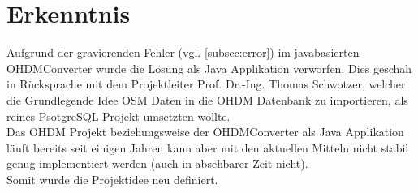 \newpage
\section{Erkenntnis}
Aufgrund der gravierenden Fehler (vgl. \autoref{subsec:error}) im javabasierten OHDMConverter wurde die Lösung als Java Applikation verworfen. Dies geschah in Rücksprache mit dem Projektleiter Prof. Dr.-Ing. Thomas Schwotzer, welcher die Grundlegende Idee \ac{OSM} Daten in die \ac{OHDM} Datenbank zu importieren, als reines PsotgreSQL Projekt umsetzten wollte.\\
Das \ac{OHDM} Projekt beziehungsweise der OHDMConverter als Java Applikation läuft bereits seit einigen Jahren kann aber mit den aktuellen Mitteln nicht stabil genug implementiert werden (auch in absehbarer Zeit nicht).\\

Somit wurde die Projektidee neu definiert.